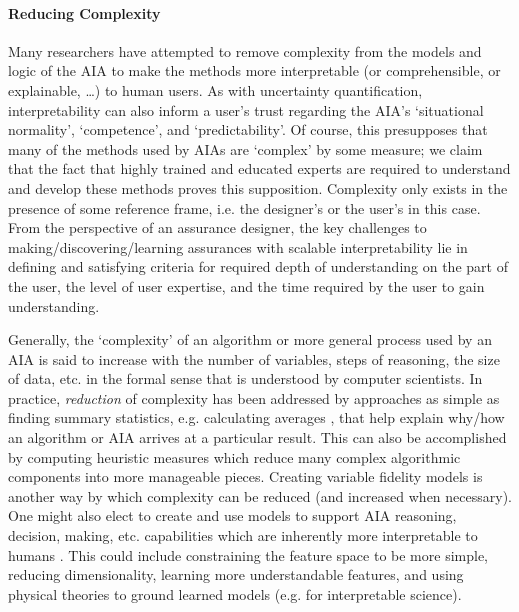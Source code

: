     \paragraph{Reducing Complexity} Many researchers have attempted to remove complexity from the models and logic of the AIA to make the methods more interpretable (or comprehensible, or explainable, \ldots) to human users. 
As with uncertainty quantification, interpretability can also inform a user's trust regarding the AIA's `situational normality', `competence', and `predictability'. Of course, this presupposes that many of the methods used by AIAs are `complex' by some measure; we claim that the fact that highly trained and educated experts are required to understand and develop these methods %
proves this supposition. Complexity only exists in the presence of some reference frame, i.e. the designer's or the user's in this case. 
From the perspective of an assurance designer, the key challenges to making/discovering/learning assurances with scalable interpretability lie in defining and satisfying criteria for required depth of understanding on the part of the user, the level of user expertise, and the time required by the user to gain understanding. 

Generally, the `complexity' of an algorithm or more general process used by an AIA is said to increase with the number of variables, steps of reasoning, the size of data, etc. in the formal sense that is understood by computer scientists. 
In practice, \textit{reduction} of complexity has been addressed by approaches as simple as finding summary statistics, e.g. calculating averages \cite{Muir1994-ow,Muir1996-gt}, that help explain why/how an algorithm or AIA arrives at a particular result. 
This can also be accomplished by computing heuristic measures which reduce many complex algorithmic components into more manageable pieces\cite{Aitken2016-fb}. Creating variable fidelity models is another way by which complexity can be reduced (and increased when necessary). One might also elect to create and use models to support AIA reasoning, decision, making, etc. capabilities which are inherently more interpretable to humans \cite{Caruana2015-za}. This could include constraining the feature space to be more simple, reducing dimensionality, learning more understandable features, and using physical theories to ground learned models (e.g. for interpretable science).  %
    
